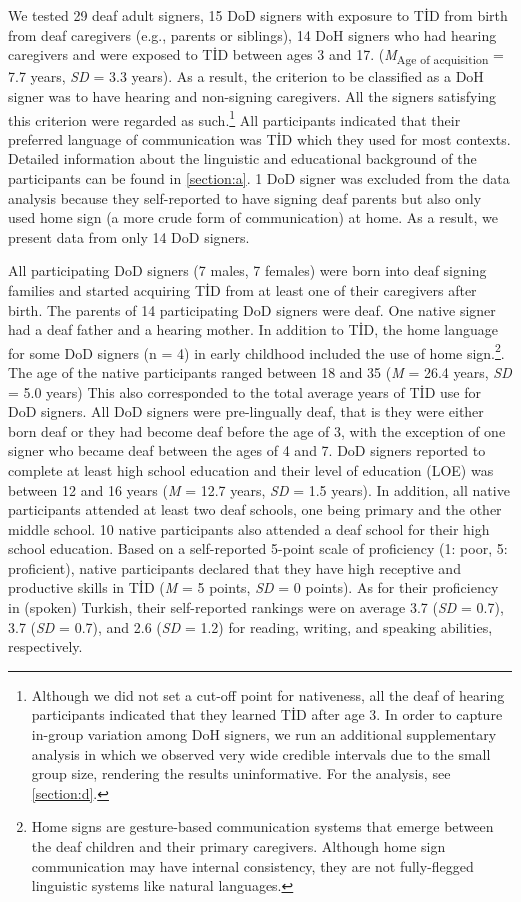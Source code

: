 \documentclass[]{elsarticle} %
\begin{document}
We tested 29 deaf adult signers, 15 DoD signers with exposure to TİD
from birth from deaf caregivers (e.g., parents or siblings), 14 DoH
signers who had hearing caregivers and were exposed to TİD between ages
3 and 17. (\emph{M}\textsubscript{Age of acquisition} = 7.7 years,
\emph{SD} = 3.3 years). As a result, the criterion to be classified as a
DoH signer was to have hearing and non-signing caregivers. All the
signers satisfying this criterion were regarded as
such.\footnote{Although we did not set a cut-off point for nativeness, all the deaf of hearing participants indicated that they learned TİD after age 3. In order to capture in-group variation among DoH signers, we run an additional supplementary analysis in which we observed very wide credible intervals due to the small group size, rendering the results uninformative. For the analysis, see \ref{section:d}.}
All participants indicated that their preferred language of
communication was TİD which they used for most contexts. Detailed
information about the linguistic and educational background of the
participants can be found in \ref{section:a}. 1 DoD signer was excluded
from the data analysis because they self-reported to have signing deaf
parents but also only used home sign (a more crude form of
communication) at home. As a result, we present data from only 14 DoD
signers.

All participating DoD signers (7 males, 7 females) were born into deaf
signing families and started acquiring TİD from at least one of their
caregivers after birth. The parents of 14 participating DoD signers were
deaf. One native signer had a deaf father and a hearing mother. In
addition to TİD, the home language for some DoD signers (n = 4) in early
childhood included the use of home
sign.\footnote{Home signs are gesture-based communication systems that emerge between the deaf children and their primary caregivers. Although home sign communication may have internal consistency, they are not fully-flegged linguistic systems like natural languages.}.
The age of the native participants ranged between 18 and 35 (\emph{M} =
26.4 years, \emph{SD} = 5.0 years) This also corresponded to the total
average years of TİD use for DoD signers. All DoD signers were
pre-lingually deaf, that is they were either born deaf or they had
become deaf before the age of 3, with the exception of one signer who
became deaf between the ages of 4 and 7. DoD signers reported to
complete at least high school education and their level of education
(LOE) was between 12 and 16 years (\emph{M} = 12.7 years, \emph{SD} =
1.5 years). In addition, all native participants attended at least two
deaf schools, one being primary and the other middle school. 10 native
participants also attended a deaf school for their high school
education. Based on a self-reported 5-point scale of proficiency (1:
poor, 5: proficient), native participants declared that they have high
receptive and productive skills in TİD (\emph{M} = 5 points, \emph{SD} =
0 points). As for their proficiency in (spoken) Turkish, their
self-reported rankings were on average 3.7 (\emph{SD} = 0.7), 3.7
(\emph{SD} = 0.7), and 2.6 (\emph{SD} = 1.2) for reading, writing, and
speaking abilities, respectively.
\end{document}

